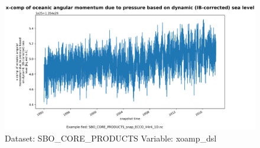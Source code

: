 \begin{figure}[H]
\centering
\includegraphics[width=\textwidth]{../images/plots/oneD_plots/SBO_Core_Products/xoamp_dsl.png}
\caption{Dataset: SBO\_CORE\_PRODUCTS Variable: xoamp\_dsl}
\label{tab:table-SBO_CORE_PRODUCTS_xoamp_dsl-Plot}
\end{figure}
\pagebreak
